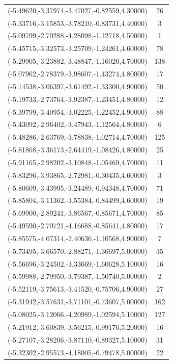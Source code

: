 \documentclass[12pt, fullpage,letterpaper]{article}
\begin{document}
\begin{longtable}{c|c}
(-5.49620,-3.37974,-3.47027,-0.82559,4.30000) & 26 \\
(-5.33716,-3.15853,-3.78210,-0.83731,4.40000) & 3 \\
(-5.09799,-2.70288,-4.28098,-1.12718,4.50000) & 1 \\
(-5.45715,-3.32573,-3.25709,-1.24261,4.60000) & 78 \\
(-5.29905,-3.23882,-3.48847,-1.16020,4.70000) & 138 \\
(-5.07962,-2.78379,-3.98607,-1.43274,4.80000) & 17 \\
(-5.14538,-3.06397,-3.61492,-1.33300,4.90000) & 50 \\
(-5.19733,-2.73764,-3.92387,-1.23451,4.80000) & 12 \\
(-5.39799,-3.40954,-3.02225,-1.22452,4.90000) & 88 \\
(-5.43092,-2.96402,-3.47943,-1.12564,4.80000) & 6 \\
(-5.48286,-2.63769,-3.78838,-1.02714,4.70000) & 125 \\
(-5.81868,-3.36173,-2.64419,-1.08426,4.80000) & 25 \\
(-5.91165,-2.98202,-3.10848,-1.05469,4.70000) & 11 \\
(-5.83296,-3.93865,-2.72981,-0.30435,4.60000) & 3 \\
(-5.80609,-3.43995,-3.24489,-0.94348,4.70000) & 71 \\
(-5.85804,-3.11362,-3.55384,-0.84499,4.60000) & 19 \\
(-5.69900,-2.89241,-3.86567,-0.85671,4.70000) & 85 \\
(-5.49590,-2.70721,-4.16688,-0.85641,4.80000) & 17 \\
(-5.85575,-4.07314,-2.40636,-1.10568,4.90000) & 7 \\
(-5.73495,-3.66570,-2.88271,-1.36697,5.00000) & 35 \\
(-5.56696,-3.24502,-3.33669,-1.60628,5.10000) & 16 \\
(-5.59988,-2.79950,-3.79387,-1.50740,5.00000) & 2 \\
(-5.52119,-3.75613,-3.41520,-0.75706,4.90000) & 27 \\
(-5.31942,-3.57631,-3.71101,-0.73607,5.00000) & 162 \\
(-5.08025,-3.12066,-4.20989,-1.02594,5.10000) & 127 \\
(-5.21912,-3.60839,-3.56215,-0.99176,5.20000) & 16 \\
(-5.27107,-3.28206,-3.87110,-0.89327,5.10000) & 31 \\
(-5.32302,-2.95573,-4.18005,-0.79478,5.00000) & 22 \\

\end{longtable}
\end{document}
